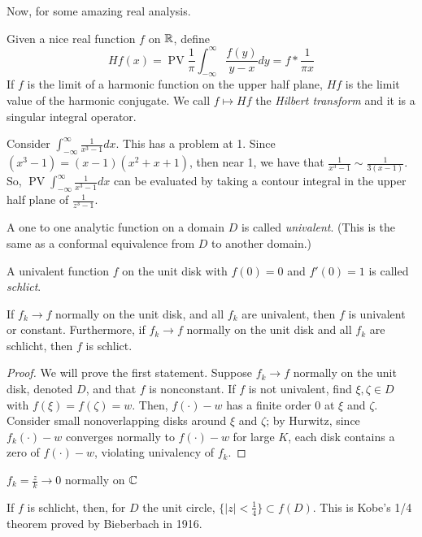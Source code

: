 \documentclass[11pt,leqno,oneside]{amsart}
\numberwithin{thm}{section}
\newcommand{\PV}{\operatorname{PV}}
\begin{document}
  Now, for some amazing real analysis.
  \begin{defn}
    Given a nice real function $f$ on ${\mathbb R}$, define \[
      H f(x) = \PV \frac{1}{\pi} \int_{-\infty}^\infty
      \frac{f(y)}{y-x}dy = f * \frac{1}{\pi x}
    \]
    If $f$ is the limit of a harmonic function on the upper half
    plane, $Hf$ is the limit value of the harmonic conjugate. We call
    $f \mapsto Hf$ the \emph{Hilbert transform} and it is a singular
    integral operator.
  \end{defn}
  \begin{example}
    Consider $\int_{-\infty}^\infty \frac{1}{x^3-1}dx$. This has a
    problem at 1. Since $(x^3-1) = (x-1)(x^2+x+1)$, then near 1, we
    have that $\frac{1}{x^3-1} \sim \frac{1}{3(x-1)}$. So, $\PV
    \int_{-\infty}^\infty \frac{1}{x^3-1}dx$ can be evaluated by
    taking a contour integral in the upper half plane of
    $\frac{1}{z^3-1}$.
  \end{example}
  \begin{defn}
    A one to one analytic function on a domain $D$ is called
    \emph{univalent}. (This is the same as a conformal equivalence
    from $D$ to another domain.)
  \end{defn}
  \begin{defn}
    A univalent function $f$ on the unit disk with $f(0) = 0$ and
    $f'(0) = 1$ is called \emph{schlict}.
  \end{defn}
  \begin{prop}
    If $f_k \to f$ normally on the unit disk, and all $f_k$ are
    univalent, then $f$ is univalent or constant. Furthermore, if $f_k
    \to f$ normally on the unit disk and all $f_k$ are schlicht, then
    $f$ is schlict.
  \end{prop}
  \begin{proof}
    We will prove the first statement. Suppose $f_k \to f$ normally on
    the unit disk, denoted $D$, and that $f$ is nonconstant. If $f$ is
    not univalent, find $\xi, \zeta \in D$ with $f(\xi) = f(\zeta) =
    w$. Then, $f(\cdot)-w$ has a finite order 0 at $\xi$ and
    $\zeta$. Consider small nonoverlapping disks around $\xi$ and
    $\zeta$; by Hurwitz, since $f_k(\cdot)-w$ converges normally to
    $f(\cdot)-w$ for large $K$, each disk contains a zero of
    $f(\cdot)-w$, violating univalency of $f_k$.
  \end{proof}
  \begin{example}
    $f_k = \frac{z}{k} \to 0$ normally on ${\mathbb C}$
  \end{example}
  \begin{prop}
    If $f$ is schlicht, then, for $D$ the unit circle, $\{|z| <
    \frac{1}{4}\} \subset f(D)$. This is Kobe's 1/4 theorem proved by
    Bieberbach in 1916.
  \end{prop}
\end{document}
